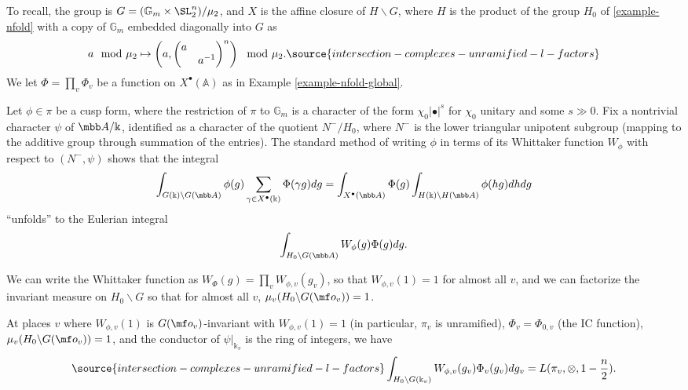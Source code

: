 To recall, the group is $G=(\mathbb G_m\times \SL_2^n)/\mu_2$, and $X$ is the affine closure of $H\backslash G$, where $H$ is the product of the group $H_0$ of \eqref{example-nfold} with a copy of $\mathbb G_m$ embedded diagonally into $G$ as
\begin{equation}\label{Gmembedding} a \mod \mu_2 \mapsto \left( a, \begin{pmatrix} a \\ & a^{-1}\end{pmatrix}^n \right ) \mod \mu_2.
\source{intersection-complexes-unramified-l-factors}
\end{equation}
We let $\Phi = \prod_v \Phi_v$ be a function on $X^\bullet(\mathbb A)$ as in Example \ref{example-nfold-global}.

Let $\phi\in \pi$ be a cusp form, where the restriction of $\pi$ to $\mathbb G_m$ is a character of the form $\chi_0 |\bullet|^s$ for $\chi_0$ unitary and some $s \gg 0$. Fix a nontrivial character $\psi$ of $\mbb A/\Bbbk$, identified as a character of the quotient $N^-/H_0$, where $N^-$ is the lower triangular unipotent subgroup (mapping to the additive group through summation of the entries). The standard method of writing $\phi$ in terms of its Whittaker function $W_\phi$ with respect to $(N^-,\psi)$ shows that the integral
\[ \int_{G(\Bbbk)\backslash G(\mbb A)} \phi(g) \sum_{\gamma\in X^\bullet(\Bbbk)} \Phi(\gamma g) dg = \int_{X^\bullet(\mbb A)} \Phi(g) \int_{H(\Bbbk)\backslash H(\mbb A)} \phi(hg) dh dg\]
``unfolds'' to the Eulerian integral
 \[ \int_{H_0\backslash G (\mbb A)} W_\phi(g) \Phi(g) dg.\]

We can write the Whittaker function as $W_\Phi(g) = \prod_v W_{\phi, v}(g_v)$, so that $W_{\phi,v}(1) = 1$ for almost all $v$, and we can factorize the invariant measure on $H_0\backslash G$ so that for almost all $v$, $\mu_v(H_0\backslash G(\mf o_v)) = 1$.

\begin{prop}
\notready\label{prop:localzeta}
At places $v$ where $W_{\phi,v}(1)$ is $G(\mf o_v)$-invariant with $W_{\phi,v}(1) = 1$ (in particular, $\pi_v$ is unramified), $\Phi_v=\Phi_{0,v}$ (the IC function), $\mu_v(H_0\backslash G(\mf o_v)) = 1$, and the conductor of $\psi|_{\Bbbk_v}$ is the ring of integers, we have
\begin{equation}\label{eq:localzetafactor}
\source{intersection-complexes-unramified-l-factors}
   \int_{H_0\backslash G (\Bbbk_v)} W_{\phi,v}(g_v) \Phi_v(g_v) dg_v = L(\pi_v, \otimes, 1 - \frac{n}{2}).
\end{equation}
\end{prop}

